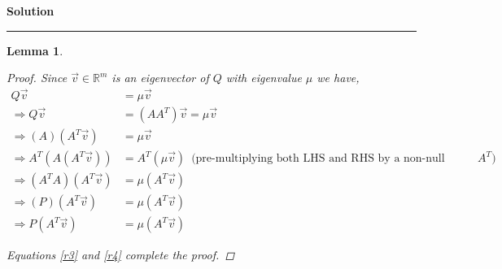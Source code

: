\documentclass[a4paper,12pt]{article}
\newenvironment{solution}[2][]{%
    \begin{mdframed}[linecolor=blue!70!black, linewidth=2pt, roundcorner=10pt, backgroundcolor=yellow!10!white, skipabove=12pt, skipbelow=12pt]%
        \textbf{\large #2}
        \par\noindent\rule{\textwidth}{0.4pt}
}{
    \end{mdframed}
}
\newtheorem{lemma}{Lemma}
\begin{document}
\begin{solution}{Solution}
\begin{lemma}
\begin{proof}
            Since $\vec{v} \in \mathbb{R}^{m}$ is an eigenvector of $Q$ with eigenvalue $\mu$ we have,
            \begin{align}
              Q\vec{v} &= \mu \vec{v} \nonumber \\
              \Rightarrow Q\vec{v} &= (AA^{T}) \vec{v} = \mu \vec{v} \nonumber \\
              \Rightarrow (A) (A^{T} \vec{v}) &= \mu \vec{v} \nonumber \\
              \Rightarrow A^{T} \left( A (A^{T}\vec{v})\right) &= A^{T} \left( \mu \vec{v}\right) \nonumber \, \text{ (pre-multiplying both LHS and RHS by a non-null matrix $A^{T}$)} \nonumber \\
              \Rightarrow  (A^{T} A) (A^{T}\vec{v}) &= \mu (A^{T} \vec{v}) \nonumber \\
              \Rightarrow (P) (A^{T}\vec{v}) &= \mu (A^{T}\vec{v}) \nonumber \\
              \Rightarrow  \label{r4}P (A^{T}\vec{v}) &= \mu (A^{T}\vec{v})
            \end{align}

            Equations \@\ref{r3} and \@\ref{r4} complete the proof.
          \end{proof}
        \end{lemma}


\end{solution}
\end{document}
